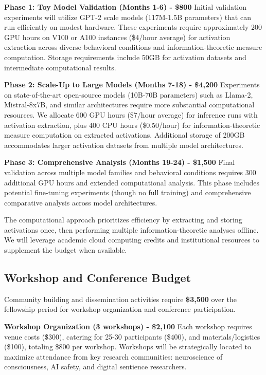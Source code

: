 \documentclass[11pt,a4paper]{article}
\begin{document}
    \textbf{Phase 1: Toy Model Validation (Months 1-6) - \$800}
    Initial validation experiments will utilize GPT-2 scale models (117M-1.5B parameters) that can run efficiently on modest hardware. These experiments require approximately 200 GPU hours on V100 or A100 instances (\$4/hour average) for activation extraction across diverse behavioral conditions and information-theoretic measure computation. Storage requirements include 50GB for activation datasets and intermediate computational results.
    
    \textbf{Phase 2: Scale-Up to Large Models (Months 7-18) - \$4,200}
    Experiments on state-of-the-art open-source models (10B-70B parameters) such as Llama-2, Mistral-8x7B, and similar architectures require more substantial computational resources. We allocate 600 GPU hours (\$7/hour average) for inference runs with activation extraction, plus 400 CPU hours (\$0.50/hour) for information-theoretic measure computation on extracted activations. Additional storage of 200GB accommodates larger activation datasets from multiple model architectures.
    
    \textbf{Phase 3: Comprehensive Analysis (Months 19-24) - \$1,500}
    Final validation across multiple model families and behavioral conditions requires 300 additional GPU hours and extended computational analysis. This phase includes potential fine-tuning experiments (though no full training) and comprehensive comparative analysis across model architectures.
    
    The computational approach prioritizes efficiency by extracting and storing activations once, then performing multiple information-theoretic analyses offline. We will leverage academic cloud computing credits and institutional resources to supplement the budget when available.
    
    \subsection{Workshop and Conference Budget}
    
    Community building and dissemination activities require \textbf{\$3,500} over the fellowship period for workshop organization and conference participation.
    
    \textbf{Workshop Organization (3 workshops) - \$2,100}
    Each workshop requires venue costs (\$300), catering for 25-30 participants (\$400), and materials/logistics (\$100), totaling \$800 per workshop. Workshops will be strategically located to maximize attendance from key research communities: neuroscience of consciousness, AI safety, and digital sentience researchers.
    
\end{document}

